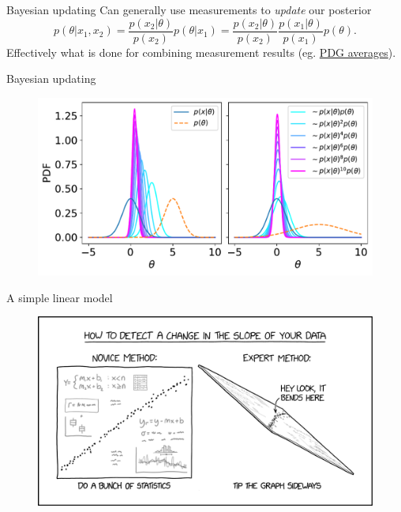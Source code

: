 \documentclass[
aspectratio=169,
14pt,
professionalfonts
]{beamer}
\begin{document}
    \begin{frame}{Bayesian updating}
        Can generally use measurements to \textit{update} our posterior
        $$
        p(\theta | x_1, x_2) = \frac{p(x_2|\theta)}{p(x_2)} p(\theta | x_1) = \frac{p(x_2|\theta)}{p(x_2)} \frac{p(x_1|\theta)}{p(x_1)} p(\theta).
        $$
        Effectively what is done for combining measurement results (eg. \href{https://pdg.lbl.gov/}{PDG averages}).

    \end{frame}
    
    \begin{frame}{Bayesian updating}
        \begin{figure}
            \centering
            \includegraphics[width=0.9\linewidth]{../plots/updating.pdf}
        \end{figure}
    \end{frame}

\begin{frame}{A simple linear model}
    \begin{figure}
        \centering
        \includegraphics[width=0.8\linewidth]{../plots/change_in_slope_2x.png}
    \end{figure}
\end{frame}
\end{document}
